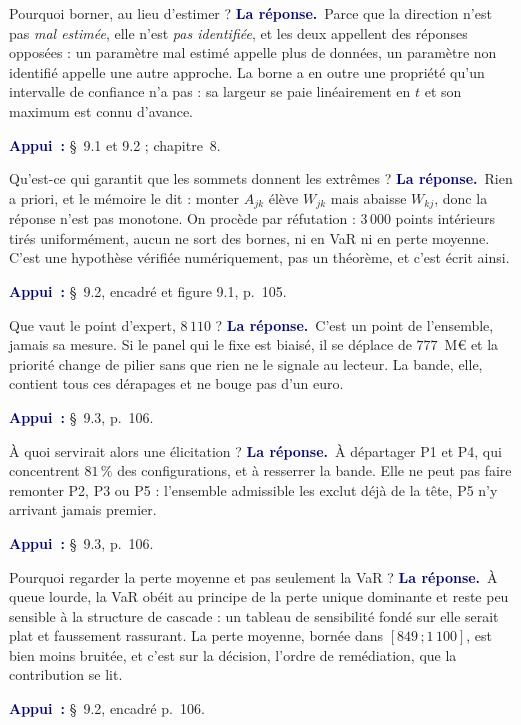 \documentclass[11pt,a4paper]{article}
\newcommand{\rep}[1]{\smallskip\noindent\textcolor{navy}{\textbf{La réponse.}}\ #1\par}
\newcommand{\appui}[1]{\smallskip\noindent\small\textcolor{navy}{\textbf{Appui~:}} #1\par\normalsize}
\begin{document}
\begin{question}{\og Pourquoi borner, au lieu d'estimer ?\fg{}}
\rep{Parce que la direction n'est pas \emph{mal estimée}, elle n'est \emph{pas identifiée}, et
les deux appellent des réponses opposées : un paramètre mal estimé appelle plus de données, un
paramètre non identifié appelle une autre approche. La borne a en outre une propriété qu'un
intervalle de confiance n'a pas : sa largeur se paie linéairement en $t$ et son maximum est connu
d'avance.}
\appui{\S~9.1 et 9.2 ; chapitre~8.}
\end{question}

\begin{question}{\og Qu'est-ce qui garantit que les sommets donnent les extrêmes ?\fg{}}
\rep{Rien a priori, et le mémoire le dit : monter $A_{jk}$ élève $W_{jk}$ mais abaisse $W_{kj}$,
donc la réponse n'est pas monotone. On procède par réfutation : $3\,000$ points intérieurs tirés
uniformément, aucun ne sort des bornes, ni en VaR ni en perte moyenne. C'est une hypothèse vérifiée
numériquement, pas un théorème, et c'est écrit ainsi.}
\appui{\S~9.2, encadré et figure 9.1, p.~105.}
\end{question}

\begin{question}{\og Que vaut le point d'expert, $8\,110$ ?\fg{}}
\rep{C'est un point de l'ensemble, jamais sa mesure. Si le panel qui le fixe est biaisé, il se
déplace de $777$~M\euro{} et la priorité change de pilier sans que rien ne le signale au lecteur.
La bande, elle, contient tous ces dérapages et ne bouge pas d'un euro.}
\appui{\S~9.3, p.~106.}
\end{question}

\begin{question}{\og À quoi servirait alors une élicitation ?\fg{}}
\rep{À départager P1 et P4, qui concentrent $81\,\%$ des configurations, et à resserrer la bande.
Elle ne peut pas faire remonter P2, P3 ou P5 : l'ensemble admissible les exclut déjà de la tête,
P5 n'y arrivant jamais premier.}
\appui{\S~9.3, p.~106.}
\end{question}

\begin{question}{\og Pourquoi regarder la perte moyenne et pas seulement la VaR ?\fg{}}
\rep{À queue lourde, la VaR obéit au principe de la perte unique dominante et reste peu sensible
à la structure de cascade : un tableau de sensibilité fondé sur elle serait plat et faussement
rassurant. La perte moyenne, bornée dans $[849\,;1\,100]$, est bien moins bruitée, et c'est sur la
décision, l'ordre de remédiation, que la contribution se lit.}
\appui{\S~9.2, encadré p.~106.}
\end{question}
\end{document}
